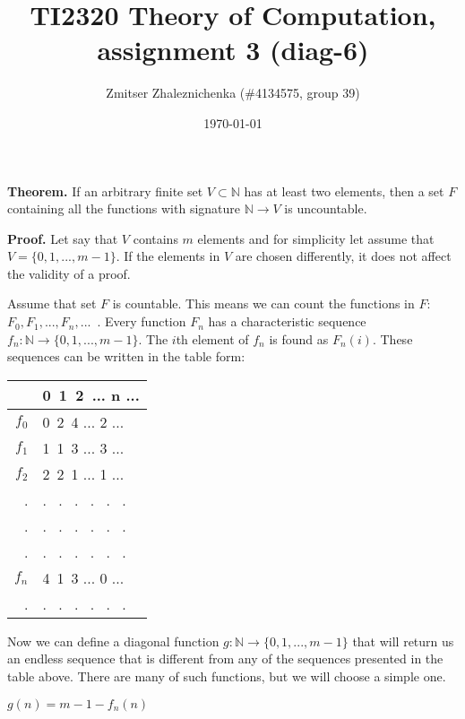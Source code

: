 \documentclass[a4paper, notitlepage]{article}
\begin{document}
\makeatletter
\renewcommand\paragraph{\@startsection{paragraph}{4}{\z@}%
  {-3.25ex\@plus -1ex \@minus -.2ex}%
  {1.5ex \@plus .2ex}%
  {\normalfont\normalsize\bfseries}}
\makeatother

\title{TI2320 Theory of Computation, assignment 3 (diag-6)} 
\author{Zmitser Zhaleznichenka (\#4134575, group 39)}
\date{\today}
\maketitle

\setcounter{secnumdepth}{0}

\textbf{Theorem.} If an arbitrary finite set $V \subset \mathbb{N}$ has at least two elements, then a set $F$ containing all the functions with signature $\mathbb{N} \rightarrow V$ is uncountable.\newline

\textbf{Proof.} Let say that $V$ contains $m$ elements and for simplicity let assume that $V = \{0, 1, ..., m-1\}$. If the elements in $V$ are chosen differently, it does not affect the validity of a proof. 

Assume that set $F$ is countable. This means we can count the functions in $F$: $F_0, F_1, ..., F_n, ...$\ . Every function $F_n$ has a characteristic sequence $f_n : \mathbb{N} \rightarrow \{0, 1, ..., m-1\}$. The $i$th element of $f_n$ is found as $F_n(i)$. These sequences can be written in the table form:

\begin{table}[h]
\centering
\begin{tabular}{r | l}
& 0\ 1\ 2\ ... n ... \\
\hline
$f_0$ & 0\ 2\ 4 ... 2 ... \\
$f_1$ & 1\ 1\ 3 ... 3 ... \\
$f_2$ & 2\ 2\ 1 ... 1 ... \\
. & . \ . \ . \ . \ . \ . \ \\ 
. & . \ . \ . \ . \ . \ . \ \\
. & . \ . \ . \ . \ . \ . \ \\
$f_n$ & 4\ 1\ 3 ... 0 ... \\
. & . \ . \ . \ . \ . \ . \ \\
\end{tabular}
\end{table}

Now we can define a diagonal function $g : \mathbb{N} \rightarrow \{0, 1, ..., m-1\}$ that will return us an endless sequence that is different from any of the sequences presented in the table above. There are many of such functions, but we will choose a simple one.
\begin{center}
$g(n) = m - 1 - f_n(n)$ 
\end{center}
\end{document}
